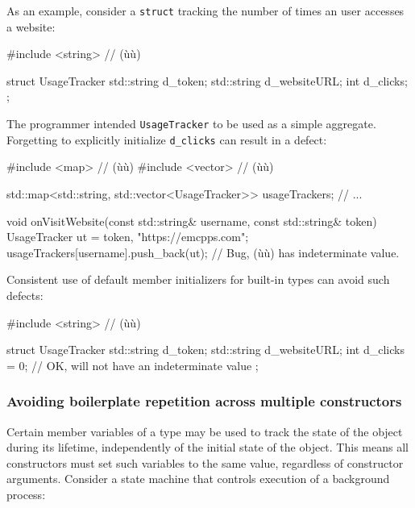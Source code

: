 As an example, consider a \lstinline!struct! tracking the number of times
an user accesses a website:

\begin{emcppslisting}[emcppsbatch=e2]
#include <string>  // (ù{}ù)

struct UsageTracker
{
    std::string d_token;
    std::string d_websiteURL;
    int         d_clicks;
};
\end{emcppslisting}
    

The programmer intended \lstinline!UsageTracker! to be used as a simple
aggregate. Forgetting to explicitly initialize \lstinline!d_clicks! can
result in a defect:

\begin{emcppslisting}[emcppsbatch=e2]
#include <map>     // (ù{}ù)
#include <vector>  // (ù{}ù)

std::map<std::string, std::vector<UsageTracker>> usageTrackers;
// ...

void onVisitWebsite(const std::string& username, const std::string& token)
{
    UsageTracker ut = {token, "https://emcpps.com"};
    usageTrackers[username].push_back(ut);
        // Bug, (ù{}ù) has indeterminate value.
}
\end{emcppslisting}
    

Consistent use of default member initializers for built-in types can
avoid such defects:

\begin{emcppslisting}
#include <string>  // (ù{}ù)

struct UsageTracker
{
    std::string d_token;
    std::string d_websiteURL;
    int         d_clicks = 0;  // OK, will not have an indeterminate value
};
\end{emcppslisting}
    

\subsubsection[Avoiding boilerplate repetition across multiple constructors]{Avoiding boilerplate repetition across multiple constructors}\label{avoiding-boilerplate-repetition-across-multiple-constructors}

Certain member variables of a type may be used to track the state of the
object during its lifetime, independently of the initial state of the
object. This means all constructors must set such variables to the same
value, regardless of constructor arguments. Consider a state machine
that controls execution of a background process:

